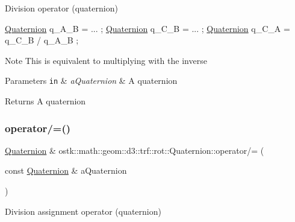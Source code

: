Division operator (quaternion) 


\begin{DoxyCode}
\hyperlink{classostk_1_1math_1_1geom_1_1d3_1_1trf_1_1rot_1_1_quaternion_ad9fd7d8eb5effb4d4e0394bbb5bb86dc}{Quaternion} q\_A\_B = ... ;
\hyperlink{classostk_1_1math_1_1geom_1_1d3_1_1trf_1_1rot_1_1_quaternion_ad9fd7d8eb5effb4d4e0394bbb5bb86dc}{Quaternion} q\_C\_B = ... ;
\hyperlink{classostk_1_1math_1_1geom_1_1d3_1_1trf_1_1rot_1_1_quaternion_ad9fd7d8eb5effb4d4e0394bbb5bb86dc}{Quaternion} q\_C\_A = q\_C\_B / q\_A\_B ;
\end{DoxyCode}


\begin{DoxyNote}{Note}
This is equivalent to multiplying with the inverse
\end{DoxyNote}

\begin{DoxyParams}[1]{Parameters}
\mbox{\tt in}  & {\em a\+Quaternion} & A quaternion \\
\hline
\end{DoxyParams}
\begin{DoxyReturn}{Returns}
A quaternion 
\end{DoxyReturn}
\mbox{\label{classostk_1_1math_1_1geom_1_1d3_1_1trf_1_1rot_1_1_quaternion_aee3bd39ff2bb79ed0817e1995329fe17}} 
\subsubsection{\texorpdfstring{operator/=()}{operator/=()}}
{\footnotesize\ttfamily \hyperlink{classostk_1_1math_1_1geom_1_1d3_1_1trf_1_1rot_1_1_quaternion}{Quaternion} \& ostk\+::math\+::geom\+::d3\+::trf\+::rot\+::\+Quaternion\+::operator/= (\begin{DoxyParamCaption}\item[{const \hyperlink{classostk_1_1math_1_1geom_1_1d3_1_1trf_1_1rot_1_1_quaternion}{Quaternion} \&}]{a\+Quaternion }\end{DoxyParamCaption})}



Division assignment operator (quaternion) 

